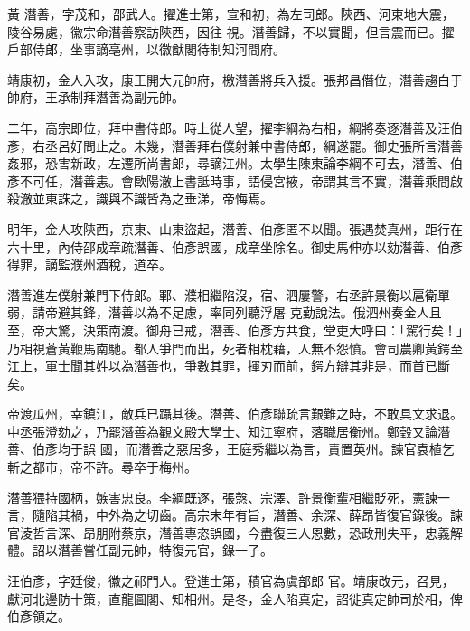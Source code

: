 
\begin{pinyinscope}

 黃
 潛善，字茂和，邵武人。擢進士第，宣和初，為左司郎。陝西、河東地大震，陵谷易處，徽宗命潛善察訪陝西，因往
 視。潛善歸，不以實聞，但言震而已。擢戶部侍郎，坐事謫亳州，以徽猷閣待制知河間府。



 靖康初，金人入攻，康王開大元帥府，檄潛善將兵入援。張邦昌僭位，潛善趨白于帥府，王承制拜潛善為副元帥。



 二年，高宗即位，拜中書侍郎。時上從人望，擢李綱為右相，綱將奏逐潛善及汪伯彥，右丞呂好問止之。未幾，潛善拜右僕射兼中書侍郎，綱遂罷。御史張所言潛善姦邪，恐害新政，左遷所尚書郎，尋謫江州。太學生陳東論李綱不可去，潛善、伯
 彥不可任，潛善恚。會歐陽澈上書詆時事，語侵宮掖，帝謂其言不實，潛善乘間啟殺澈並東誅之，識與不識皆為之垂涕，帝悔焉。



 明年，金人攻陝西，京東、山東盜起，潛善、伯彥匿不以聞。張遇焚真州，距行在六十里，內侍邵成章疏潛善、伯彥誤國，成章坐除名。御史馬伸亦以劾潛善、伯彥得罪，謫監濮州酒稅，道卒。



 潛善進左僕射兼門下侍郎。鄆、濮相繼陷沒，宿、泗屢警，右丞許景衡以扈衛單弱，請帝避其鋒，潛善以為不足慮，率同列聽浮屠
 克勤說法。俄泗州奏金人且至，帝大驚，決策南渡。御舟已戒，潛善、伯彥方共食，堂吏大呼曰：「駕行矣！」乃相視蒼黃鞭馬南馳。都人爭門而出，死者相枕藉，人無不怨憤。會司農卿黃鍔至江上，軍士聞其姓以為潛善也，爭數其罪，揮刃而前，鍔方辯其非是，而首已斷矣。



 帝渡瓜州，幸鎮江，敵兵已躡其後。潛善、伯彥聯疏言艱難之時，不敢具文求退。中丞張澄劾之，乃罷潛善為觀文殿大學士、知江寧府，落職居衡州。鄭瑴又論潛善、伯彥均于誤
 國，而潛善之惡居多，王庭秀繼以為言，責置英州。諫官袁植乞斬之都市，帝不許。尋卒于梅州。



 潛善猥持國柄，嫉害忠良。李綱既逐，張愨、宗澤、許景衡輩相繼貶死，憲諫一言，隨陷其禍，中外為之切齒。高宗末年有旨，潛善、余深、薛昂皆復官錄後。諫官淩哲言深、昂朋附蔡京，潛善專恣誤國，今盡復三人恩數，恐政刑失平，忠義解體。詔以潛善嘗任副元帥，特復元官，錄一子。



 汪伯彥，字廷俊，徽之祁門人。登進士第，積官為虞部郎
 官。靖康改元，召見，獻河北邊防十策，直龍圖閣、知相州。是冬，金人陷真定，詔徙真定帥司於相，俾伯彥領之。




\end{pinyinscope}
